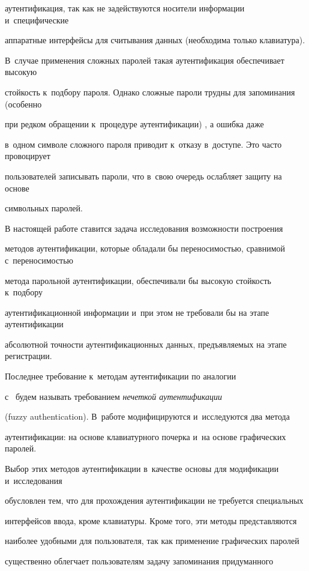 аутентификация, так как не задействуются носители информации и~специфические 


аппаратные интерфейсы для считывания данных (необходима только клавиатура). 


В~случае применения сложных паролей такая аутентификация обеспечивает высокую 


стойкость к~подбору пароля. Однако сложные пароли трудны для запоминания (особенно 


при редком обращении к~процедуре аутентификации) \cite{Idr2013}, а  ошибка даже 


в~одном символе сложного пароля приводит к~отказу в~доступе. Это часто провоцирует 


пользователей записывать пароли, что в~свою очередь ослабляет защиту на основе 


символьных паролей.





В настоящей работе ставится задача исследования возможности по\-стро\-ения 


методов аутентификации, которые обладали бы переносимостью, сравнимой с~переносимостью 


метода парольной аутентификации, обеспечивали бы высокую стойкость к~подбору 


аутентификационной информации и~при этом не требовали бы на этапе аутентификации 


абсолютной точности аутентификационных данных, предъявляемых на этапе регистрации. 


Последнее требование к~методам аутентификации по аналогии 


с~\cite{Ur2013} будем называть требованием \textit{нечеткой аутентификации} 


(fuzzy authentication). В~работе модифицируются и~исследуются два метода 


аутентификации: на основе клавиатурного почерка и~на основе графических паролей. 


Выбор этих методов аутентификации в~качестве основы для модификации и~исследования 


обусловлен тем, что для прохождения аутентификации не требуется специальных 


интерфейсов ввода, кроме клавиатуры. Кроме того, эти методы представляются 


наиболее удобными для пользователя, так как применение графических паролей 


существенно облегчает пользователям задачу запоминания придуманного 


